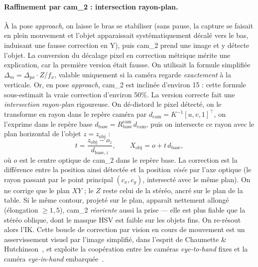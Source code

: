 \paragraph{Raffinement par cam\_2 : intersection rayon-plan.} À la pose
\textit{approach}, on laisse le bras se stabiliser (sans pause, la capture se
faisait en plein mouvement et l'objet apparaissait systématiquement décalé vers
le bas, induisant une fausse correction en Y), puis cam\_2 prend une image et y
détecte l'objet. La conversion du décalage pixel en correction métrique mérite
une explication, car la première version était fausse. On utilisait la formule
simplifiée $\Delta_m = \Delta_{px}\cdot Z / f_x$, valable uniquement si la caméra
regarde \emph{exactement} à la verticale. Or, en pose \textit{approach}, cam\_2 est
inclinée d'environ 15\textdegree{} : cette formule sous-estimait la vraie
correction d'environ 50\%. La version correcte fait une \emph{intersection
rayon-plan} rigoureuse. On dé-distord le pixel détecté, on le transforme en rayon
dans le repère caméra par $d_{\text{cam}} = K^{-1}[u,v,1]^\top$, on l'exprime dans
le repère base $d_{\text{base}} = R_{\text{base}}^{\text{cam}}\,d_{\text{cam}}$,
puis on intersecte ce rayon avec le plan horizontal de l'objet $z = z_{\text{obj}}$ :
\begin{equation}
  t = \frac{z_{\text{obj}} - o_z}{d_{\text{base},z}},
  \qquad
  X_{\text{obj}} = o + t\,d_{\text{base}},
  \label{eq:ray_plane_refine}
\end{equation}
où $o$ est le centre optique de cam\_2 dans le repère base. La correction est la
différence entre la position ainsi détectée et la position \emph{visée} par l'axe
optique (le rayon passant par le point principal $(c_x,c_y)$, intersecté avec le
même plan). On ne corrige que le plan $XY$ ; le $Z$ reste celui de la stéréo,
ancré sur le plan de la table. Si le même contour, projeté sur le plan, apparaît
nettement allongé (élongation $\geq 1{,}5$), cam\_2 \emph{réoriente} aussi la prise
— elle est plus fiable que la stéréo oblique, dont le masque HSV est faible sur
les objets fins. On re-résout alors l'IK. Cette boucle de correction par vision
en cours de mouvement est un asservissement visuel par l'image simplifié, dans
l'esprit de Chaumette \& Hutchinson~\cite{chaumette_visual_2006}, et exploite la
coopération entre les caméras \textit{eye-to-hand} fixes et la caméra
\textit{eye-in-hand} embarquée~\cite{flandin_eye--handeye--hand_2000}.

